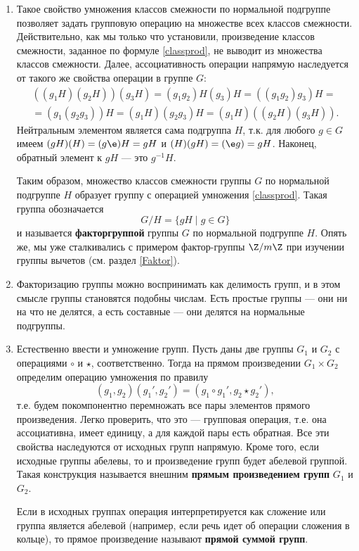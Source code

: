 \begin{enumerate}
\item Такое свойство умножения классов смежности по нормальной подгруппе позволяет задать групповую операцию на множестве всех классов смежности. Действительно, как мы только что установили, произведение классов смежности, заданное по формуле \eqref{classprod}, не выводит из множества классов смежности. Далее, ассоциативность операции напрямую наследуется от такого же свойства операции в группе $G$:
\begin{multline*}
((g_1H)(g_2H))(g_3H)=(g_1g_2)H(g_3)H=((g_1g_2)g_3)H=\\ 
=(g_1(g_2g_3))H=(g_1H)(g_2g_3)H = (g_1H)((g_2H)(g_3H)).
\end{multline*}
Нейтральным элементом является сама подгруппа $H$, т.к. для любого $g\in G$ имеем $(gH)(H)=(g\e)H=gH$ и $(H)(gH)=(\e g)=gH$. Наконец, обратный элемент к $gH$ --- это $g^{-1}H$.

Таким образом, множество классов смежности группы $G$ по нормальной подгруппе $H$ образует группу с операцией умножения \eqref{classprod}. Такая группа обозначается
$$
G/H = \{gH\mid g\in G\}
$$
и называется \textbf{факторгруппой} группы $G$ по нормальной подгруппе $H$. Опять же, мы уже сталкивались с примером фактор-группы $\Z/m\Z$ при изучении группы вычетов (см. раздел \ref{Faktor}).

\item Факторизацию группы можно воспринимать как делимость групп, и в этом смысле группы становятся подобны числам. Есть простые группы --- они ни на что не делятся, а есть составные --- они делятся на нормальные подгруппы.

\item Естественно ввести и умножение групп. Пусть даны две группы $G_1$ и $G_2$ с операциями $\circ$ и $\star$, соответственно. Тогда на прямом произведении $G_1\times G_2$ определим операцию умножения по правилу
$$
(g_1,g_2)(g_1',g_2') = (g_1\circ g_1', g_2\star g_2'),
$$
т.е. будем покомпонентно перемножать все пары элементов прямого произведения. Легко проверить, что это --- групповая операция, т.е. она ассоциативна, имеет единицу, а для каждой пары есть обратная. Все эти свойства наследуются от исходных групп напрямую. Кроме того, если исходные группы абелевы, то и произведение групп будет абелевой группой. Такая конструкция называется внешним \textbf{прямым произведением групп} $G_1$ и $G_2$.

Если в исходных группах операция интерпретируется как сложение или группа является абелевой (например, если речь идет об операции сложения в кольце), то прямое произведение называют \textbf{прямой суммой групп}.



\end{enumerate}

